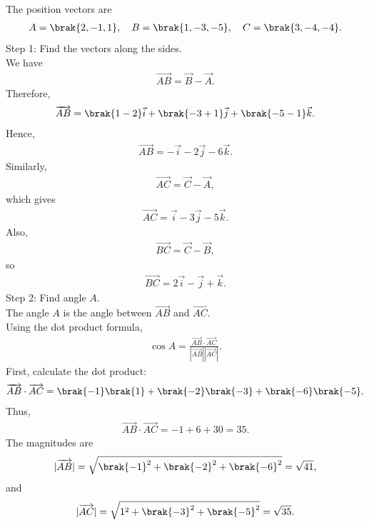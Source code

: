 \begin{enumerate}[label=\thesubsection.\arabic*, ref=\thesubsection.\theenumi]
\solution
The position vectors are
\begin{align}
A=\brak{2,-1,1},\quad B=\brak{1,-3,-5},\quad C=\brak{3,-4,-4}.
\end{align}
{Step 1: Find the vectors along the sides.}
\\We have
\begin{align}
\overrightarrow{AB}=\vec{B}-\vec{A}.
\end{align}
Therefore,
\begin{align}
\overrightarrow{AB}
=\brak{1-2}\vec{i}+\brak{-3+1}\vec{j}+\brak{-5-1}\vec{k}.
\end{align}
Hence,
\begin{align}
\overrightarrow{AB}=-\vec{i}-2\vec{j}-6\vec{k}.
\end{align}
Similarly,
\begin{align}
\overrightarrow{AC}=\vec{C}-\vec{A},
\end{align}
which gives
\begin{align}
\overrightarrow{AC}
=\vec{i}-3\vec{j}-5\vec{k}.
\end{align}
Also,
\begin{align}
\overrightarrow{BC}=\vec{C}-\vec{B},
\end{align}
so
\begin{align}
\overrightarrow{BC}=2\vec{i}-\vec{j}+\vec{k}.
\end{align}
{Step 2: Find angle $A$.}
\\The angle $A$ is the angle between
$\overrightarrow{AB}$ and $\overrightarrow{AC}$.
\\Using the dot product formula,
\begin{align}
\cos A=
\frac{\overrightarrow{AB}\cdot\overrightarrow{AC}}
{|\overrightarrow{AB}||\overrightarrow{AC}|}.
\end{align}
First, calculate the dot product:
\begin{align}
\overrightarrow{AB}\cdot\overrightarrow{AC}
=\brak{-1}\brak{1}+\brak{-2}\brak{-3}+\brak{-6}\brak{-5}.
\end{align}
Thus,
\begin{align}
\overrightarrow{AB}\cdot\overrightarrow{AC}
=-1+6+30=35.
\end{align}
The magnitudes are
\begin{align}
|\overrightarrow{AB}|
=\sqrt{\brak{-1}^2+\brak{-2}^2+\brak{-6}^2}
=\sqrt{41},
\end{align}
and
\begin{align}
|\overrightarrow{AC}|
=\sqrt{1^2+\brak{-3}^2+\brak{-5}^2}
=\sqrt{35}.
\end{align}

\end{enumerate}
